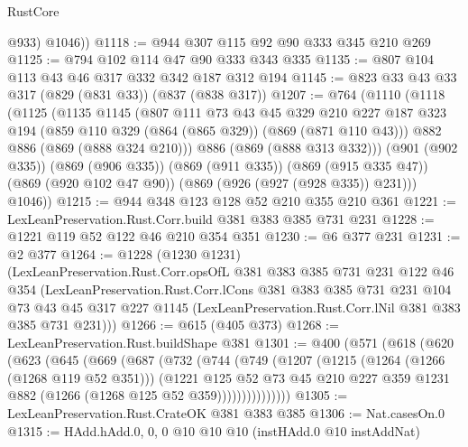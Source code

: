 \begin{lexlean}{RustCore}
\begin{coremodule}
          @933)
        @1046))
@1118 := @944 @307 @115 @92 @90 @333 @345 @210 @269
@1125 := @794 @102 @114 @47 @90 @333 @343 @335
@1135 := @807 @104 @113 @43 @46 @317 @332 @342 @187 @312 @194
@1145 := @823 @33 @43 @33 @317 (@829 (@831 @33)) (@837 (@838 @317))
@1207 := @764
    (@1110
      (@1118
        (@1125
          (@1135
            @1145
            (@807
              @111
              @73
              @43
              @45
              @329
              @210
              @227
              @187
              @323
              @194
              (@859 @110 @329 (@864 (@865 @329)) (@869 (@871 @110 @43)))
              @882
              @886
              (@869 (@888 @324 @210)))
            @886
            (@869 (@888 @313 @332)))
          (@901 (@902 @335))
          (@869 (@906 @335))
          (@869 (@911 @335))
          (@869 (@915 @335 @47))
          (@869 (@920 @102 @47 @90))
          (@869 (@926 (@927 (@928 @335)) @231)))
        @1046))
@1215 := @944 @348 @123 @128 @52 @210 @355 @210 @361
@1221 := LexLeanPreservation.Rust.Corr.build @381 @383 @385 @731 @231
@1228 := @1221 @119 @52 @122 @46 @210 @354 @351
@1230 := @6 @377 @231
@1231 := @2 @377
@1264 := @1228
    (@1230 @1231)
    (LexLeanPreservation.Rust.Corr.opsOfL
      @381
      @383
      @385
      @731
      @231
      @122
      @46
      @354
      (LexLeanPreservation.Rust.Corr.lCons
        @381
        @383
        @385
        @731
        @231
        @104
        @73
        @43
        @45
        @317
        @227
        @1145
        (LexLeanPreservation.Rust.Corr.lNil @381 @383 @385 @731 @231)))
@1266 := @615 (@405 @373)
@1268 := LexLeanPreservation.Rust.buildShape @381
@1301 := @400
    (@571
      (@618
        (@620
          (@623
            (@645
              (@669
                (@687
                  (@732
                    (@744
                      (@749
                        (@1207
                          (@1215
                            (@1264 (@1266 (@1268 @119 @52 @351)))
                            (@1221
                              @125
                              @52
                              @73
                              @45
                              @210
                              @227
                              @359
                              @1231
                              @882
                              (@1266 (@1268 @125 @52 @359)))))))))))))))
@1305 := LexLeanPreservation.Rust.CrateOK @381 @383 @385
@1306 := Nat.casesOn.{0}
@1315 := HAdd.hAdd.{0, 0, 0} @10 @10 @10 (instHAdd.{0} @10 instAddNat)

\end{coremodule}
\end{lexlean}
